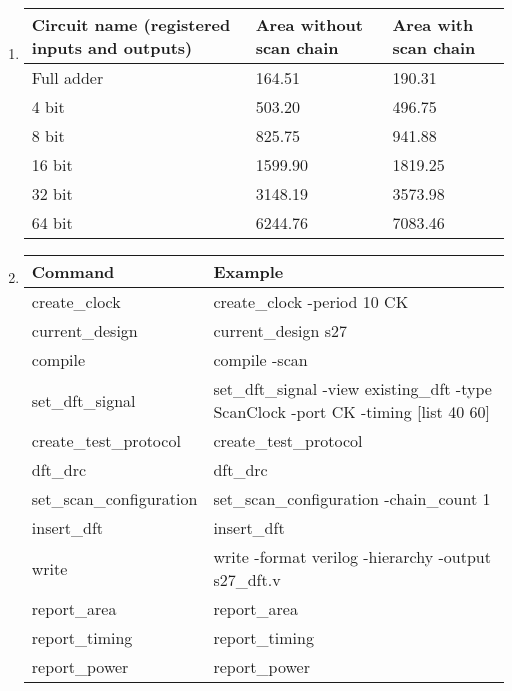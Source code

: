 \documentclass[a4paper,12pt]{article}
\begin{document}
\begin{enumerate}
        \item \begin{tabularx}{\textwidth}{|X|X|X|}
                \hline
                Circuit name (registered inputs and outputs) & Area without scan chain & Area with scan chain \\ \hline
                Full adder & 164.51 & 190.31\\ \hline
                4 bit & 503.20 & 496.75\\ \hline
                8 bit & 825.75 & 941.88\\ \hline
                16 bit & 1599.90 & 1819.25\\ \hline
                32 bit & 3148.19 & 3573.98\\ \hline
                64 bit & 6244.76 & 7083.46\\ \hline
            \end{tabularx}

        \item \begin{tabularx}{\textwidth}{|X|X|}
                \hline
                Command & Example \\ \hline
                create\_clock & create\_clock -period 10 CK \\ \hline
                current\_design & current\_design s27 \\ \hline
                compile & compile -scan \\ \hline
                set\_dft\_signal & set\_dft\_signal -view existing\_dft -type ScanClock -port CK -timing [list 40 60] \\ \hline
                create\_test\_protocol & create\_test\_protocol \\ \hline
                dft\_drc & dft\_drc \\ \hline
                set\_scan\_configuration & set\_scan\_configuration -chain\_count 1 \\ \hline
                insert\_dft & insert\_dft \\ \hline
                write & write -format verilog -hierarchy -output s27\_dft.v \\ \hline
                report\_area & report\_area \\ \hline
                report\_timing & report\_timing \\ \hline
                report\_power & report\_power \\ \hline
            \end{tabularx}

    \end{enumerate}
\end{document}
